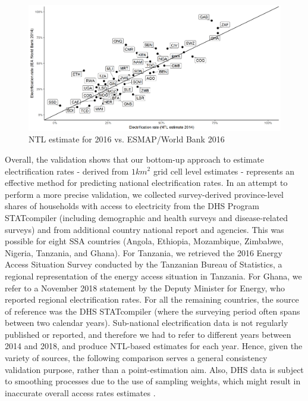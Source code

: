 \documentclass[preprint,12pt]{elsarticle}
\begin{document}
\begin{figure}[H]
    \centering
    \includegraphics[scale=0.5]{figures/comparisonwb.png}
    \caption{NTL estimate for 2016 vs. ESMAP/World Bank 2016}
    \label{ntlesmap}
\end{figure}

Overall, the validation shows that our bottom-up approach to estimate electrification rates - derived from $1 km^2$ grid cell level estimates - represents an effective method for predicting national electrification rates. In an attempt to perform a more precise validation, we collected survey-derived province-level shares of households with access to electricity from the DHS Program STATcompiler (including demographic and health surveys and disease-related surveys) and from additional country national report and agencies. This was possible for eight SSA countries (Angola, Ethiopia, Mozambique, Zimbabwe, Nigeria, Tanzania, and Ghana). For Tanzania, we retrieved the 2016 Energy Access Situation Survey conducted by the Tanzanian Bureau of Statistics, a regional representation of the energy access situation in Tanzania. For Ghana, we refer to a November 2018 statement by the Deputy Minister for Energy, who reported regional electrification rates. For all the remaining countries, the source of reference was the DHS STATcompiler (where the surveying period often spans between two calendar years). Sub-national electrification data is not regularly published or reported, and therefore we had to refer to different years between 2014 and 2018, and produce NTL-based estimates for each year. Hence, given the variety of sources, the following comparison serves a general consistency validation purpose, rather than a point-estimation aim. Also, DHS data is subject to smoothing processes due to the use of sampling weights, which might result in inaccurate overall access rates estimates \citep{macro2009measure}. 
\end{document}
